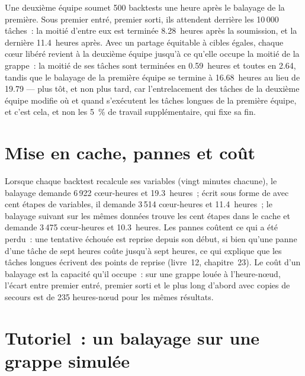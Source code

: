 Une deuxième équipe soumet 500 backtests une heure après le balayage de la première. Sous premier entré, premier sorti, ils attendent derrière les 10\,000 tâches~: la moitié
d'entre eux est terminée 8.28~heures après la soumission, et la dernière 11.4~heures après. Avec un partage équitable à cibles égales, chaque cœur libéré revient à la deuxième équipe
jusqu'à ce qu'elle occupe la moitié de la grappe~: la moitié de ses tâches sont terminées en 0.59~heures et toutes en 2.64, tandis que le balayage de la première équipe se termine à
16.68~heures au lieu de 19.79 --- plus tôt, et non plus tard, car l'entrelacement des tâches de la deuxième équipe modifie où et quand s'exécutent les tâches longues de la première
équipe, et c'est cela, et non les 5~\% de travail supplémentaire, qui fixe sa fin.

\section{Mise en cache, pannes et coût}

Lorsque chaque backtest recalcule ses variables (vingt minutes chacune), le balayage demande 6\,922 cœur-heures et 19.3~heures~; écrit sous forme de 
avec cent étapes de variables, il demande 3\,514 cœur-heures et 11.4~heures~; le balayage suivant sur les mêmes données trouve les cent étapes dans le
cache et demande 3\,475 cœur-heures et 10.3~heures. Les pannes coûtent ce qui a été perdu~: une tentative échouée est reprise depuis son début, si bien qu'une panne
d'une tâche de sept heures coûte jusqu'à sept heures, ce qui explique que les tâches longues écrivent des points de reprise (livre~12, chapitre~23). Le coût d'un balayage est la capacité qu'il occupe~:
sur une grappe louée à l'heure-nœud, l'écart entre premier entré, premier sorti et le plus long d'abord avec copies de secours est de 235 heures-nœud pour
les mêmes résultats.

\section{Tutoriel~: un balayage sur une grappe simulée}\label{tut:pl:distributed-compute-and-schedulers:tut}

